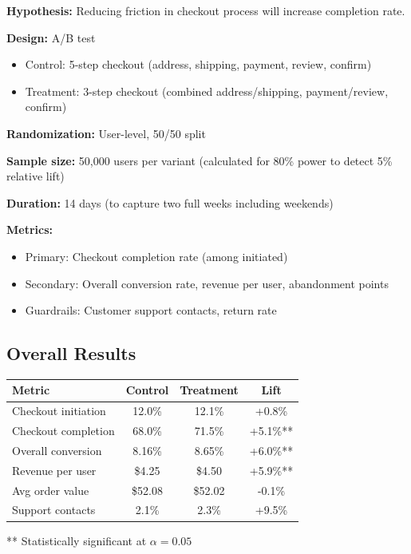 \textbf{Hypothesis:} Reducing friction in checkout process will increase completion rate.

\textbf{Design:} A/B test
\begin{itemize}
    \item Control: 5-step checkout (address, shipping, payment, review, confirm)
    \item Treatment: 3-step checkout (combined address/shipping, payment/review, confirm)
\end{itemize}

\textbf{Randomization:} User-level, 50/50 split

\textbf{Sample size:} 50,000 users per variant (calculated for 80\% power to detect 5\% relative lift)

\textbf{Duration:} 14 days (to capture two full weeks including weekends)

\textbf{Metrics:}
\begin{itemize}
    \item Primary: Checkout completion rate (among initiated)
    \item Secondary: Overall conversion rate, revenue per user, abandonment points
    \item Guardrails: Customer support contacts, return rate
\end{itemize}

\subsection{Overall Results}

\begin{center}
\begin{tabular}{lccc}
\toprule
\textbf{Metric} & \textbf{Control} & \textbf{Treatment} & \textbf{Lift} \\
\midrule
Checkout initiation & 12.0\% & 12.1\% & +0.8\% \\
Checkout completion & 68.0\% & 71.5\% & +5.1\%** \\
Overall conversion & 8.16\% & 8.65\% & +6.0\%** \\
Revenue per user & \$4.25 & \$4.50 & +5.9\%** \\
Avg order value & \$52.08 & \$52.02 & -0.1\% \\
Support contacts & 2.1\% & 2.3\% & +9.5\% \\
\bottomrule
\end{tabular}
\end{center}

** Statistically significant at $\alpha = 0.05$

